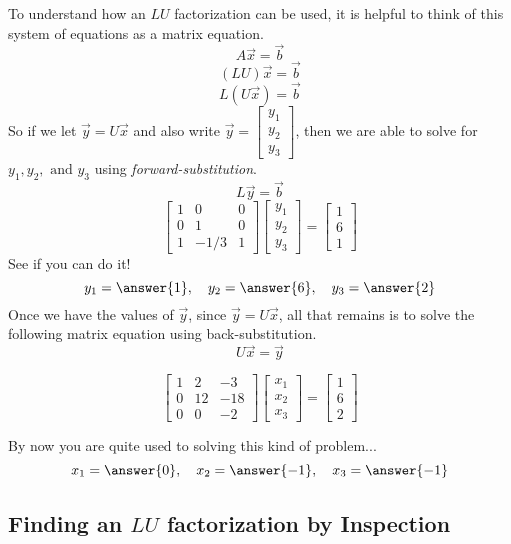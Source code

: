 \documentclass{ximera}
\begin{document}
\begin{example}
To understand how an $LU$ factorization can be used, it is helpful to think of this system of equations as a matrix equation.
$$A\vec{x}=\vec{b}$$
$$(LU)\vec{x}=\vec{b}$$
$$L(U\vec{x})=\vec{b}$$
So if we let $\vec{y}=U\vec{x}$ and also write $\vec{y}=\begin{bmatrix} y_1 \\ y_2 \\ y_3 \end{bmatrix}$, then we are able to solve for $ y_1, y_2, \text{ and } y_3$ using \emph{forward-substitution}.
$$L\vec{y}=\vec{b}$$
\[
\begin{bmatrix}
1 & 0 & 0 \\
0 & 1 & 0 \\
1  & -1/3  & 1
\end{bmatrix} 
\begin{bmatrix} y_1 \\ y_2 \\ y_3 \end{bmatrix}
=
\begin{bmatrix} 1 \\ 6 \\ 1 \end{bmatrix}
\]
See if you can do it!
$$y_1=\answer{1},\quad y_2=\answer{6},\quad y_3=\answer{2}$$
Once we have the values of $\vec{y}$, since $\vec{y}=U\vec{x}$, all that remains is to solve the following matrix equation using back-substitution.
$$U\vec{x}=\vec{y}$$

\begin{expandable}{}{}
$$\begin{bmatrix}
1 & 2 & -3 \\
0 & 12  & -18 \\
0 & 0 & -2
\end{bmatrix} 
\begin{bmatrix} x_1 \\ x_2 \\ x_3 \end{bmatrix}
=
\begin{bmatrix} 1 \\ 6 \\ 2 \end{bmatrix}$$


By now you are quite used to solving this kind of problem...
$$x_1=\answer{0},\quad x_2=\answer{-1},\quad x_3=\answer{-1}$$
\end{expandable}
\end{example}


\subsection*{Finding an $LU$ factorization by Inspection}
\end{document}
